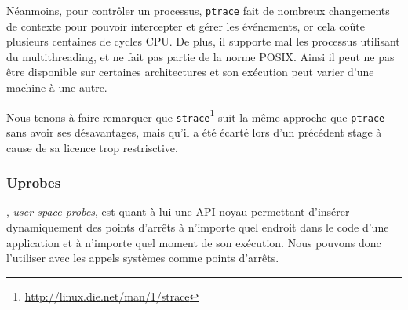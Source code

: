 Néanmoins, pour contrôler un processus, \texttt{ptrace} fait de nombreux
changements de contexte pour pouvoir intercepter et gérer les événements, or
cela coûte plusieurs centaines de cycles CPU. De plus, il supporte mal
les processus utilisant du multithreading, et ne fait pas partie de la norme
POSIX. Ainsi il peut ne pas être disponible sur certaines architectures et son
exécution peut varier d'une machine à une autre.

Nous tenons à faire remarquer que \texttt{strace}\footnote{\url{http://linux.die.net/man/1/strace}} suit la même approche que \texttt{ptrace} sans avoir ses désavantages, mais qu'il a été écarté lors d'un précédent stage à cause de sa licence trop restrisctive.

\subsubsection{Uprobes}\citep{AS:Interception, MARION:Interception},
\textit{user-space probes}, est quant à lui une API noyau permettant d'insérer
dynamiquement des points d'arrêts à n'importe quel endroit dans le code d'une
application et à n'importe quel moment de son exécution. Nous pouvons donc
l'utiliser avec les appels systèmes comme points d'arrêts.

